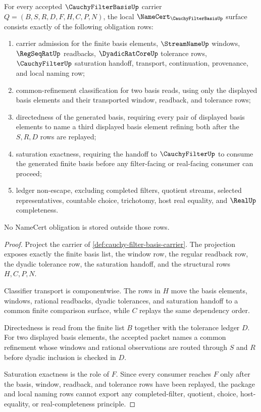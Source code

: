 \begin{theorem}
\label{thm:cauchy-filter-basis-namecert-obligations}
For every accepted $\CauchyFilterBasisUp$ carrier $Q=(B,S,R,D,F,H,C,P,N)$, the local $\NameCert_{\CauchyFilterBasisUp}$ surface consists exactly of the following obligation rows:
\begin{enumerate}
\item carrier admission for the finite basis elements, $\StreamNameUp$ windows, $\RegSeqRatUp$ readbacks, $\DyadicRatCoreUp$ tolerance rows, $\CauchyFilterUp$ saturation handoff, transport, continuation, provenance, and local naming row;
\item common-refinement classification for two basis reads, using only the displayed basis elements and their transported window, readback, and tolerance rows;
\item directedness of the generated basis, requiring every pair of displayed basis elements to name a third displayed basis element refining both after the $S,R,D$ rows are replayed;
\item saturation exactness, requiring the handoff to $\CauchyFilterUp$ to consume the generated finite basis before any filter-facing or real-facing consumer can proceed;
\item ledger non-escape, excluding completed filters, quotient streams, selected representatives, countable choice, trichotomy, host real equality, and $\RealUp$ completeness.
\end{enumerate}
No NameCert obligation is stored outside those rows.
\end{theorem}
\begin{proof}
Project the carrier of \autoref{def:cauchy-filter-basis-carrier}. The projection exposes exactly the finite basis list, the window row, the regular readback row, the dyadic tolerance row, the saturation handoff, and the structural rows $H,C,P,N$.

Classifier transport is componentwise. The rows in $H$ move the basis elements, windows, rational readbacks, dyadic tolerances, and saturation handoff to a common finite comparison surface, while $C$ replays the same dependency order.

Directedness is read from the finite list $B$ together with the tolerance ledger $D$. For two displayed basis elements, the accepted packet names a common refinement whose windows and rational observations are routed through $S$ and $R$ before dyadic inclusion is checked in $D$.

Saturation exactness is the role of $F$. Since every consumer reaches $F$ only after the basis, window, readback, and tolerance rows have been replayed, the package and local naming rows cannot export any completed-filter, quotient, choice, host-equality, or real-completeness principle.
\end{proof}

